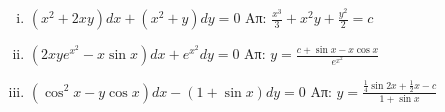 \documentclass[a4paper,12pt]{article}
\begin{document}
\begin{enumerate}
\begin{enumerate}[i)]
\item $(x^2+2xy)dx+(x^2+y)dy=0$ \hfill Απ: $\frac{x^3}{3}+x^2y+\frac{y^2}{2}=c$

\item $(2xye^{x^2}-x\sin x)dx +e^{x^2}dy = 0$ \hfill Απ: $y=\frac{c+\sin x -x\cos x}{e^{x^2}}$

\item $(\cos^2x-y\cos x)dx -(1+\sin x)dy=0$ \hfill Απ: $y=\frac{\frac{1}{4}\sin 2x+\frac{1}{2}x-c}{1+\sin x}$

\end{enumerate}

\end{enumerate}
\end{document}

